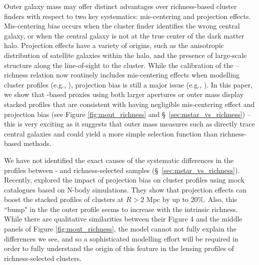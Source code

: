 \documentclass[fleqn,usenatbib,useAMS]{mnras}
\begin{document}
\begin{CJK*}{UTF8}{gbsn}
    Outer galaxy mass may offer distinct advantages over richness-based cluster finders with respect
    to two key systematics: mis-centering and projection effects.  
    Mis-centering bias occurs when the cluster finder identifies the wrong central galaxy, or when
    the central galaxy is not at the true center of the dark matter halo. 
    Projection effects have a variety of origins, such as the anisotropic distribution of satellite
    galaxies within the halo, and the presence of large-scale structure along the line-of-sight to
    the cluster. 
    While the calibration of the \mvir{}--richness relation now routinely includes mis-centering
    effects when modelling cluster \dsigma{} profiles (e.g., \citealt{Murata2018, Murata2019,
    McClintock2019}), projection bias is still a major issue (e.g., \citealt{Costanzi2019,
    Sunayama2020, DES2020, To2021b}). 
    In this paper, we show that \mstar{}-based proxies using both larger apertures or outer mass
    display stacked \dsigma{} profiles that are consistent with having negligible mis-centering
    effect and projection bias (see Figure \ref{fig:mout_richness} and \S\
    \ref{sec:mstar_vs_richness}) -- this is very exciting as it suggests that outer mass measures
    such as \menve{50}{100} directly trace central galaxies and could yield a more simple selection
    function than richness-based methods.  
    
    We have not identified the exact causes of the systematic differences in the \dsigma{} profiles
    between \mstar{}- and richness-selected samples (\S\ \ref{sec:mstar_vs_richness}).
    Recently, \citet{Sunayama2020} explored the impact of projection bias on cluster \dsigma{}
    profiles using mock catalogues based on N-body simulations.
    They show that projection effects can boost the stacked \dsigma{} profiles of clusters at $R >
    2$ Mpc by up to 20\%.
    Also, this ``bump" in the the outer \dsigma{} profile seems to increase with the intrinsic
    richness.
    While there are qualitative similarities between their Figure 4 and the middle panels of Figure
    \ref{fig:mout_richness}, the \citet{Sunayama2020} model cannot not fully explain the differences
    we see, and so a sophisticated modelling effort will be required in order to fully understand the
    origin of this feature in the lensing profiles of richness-selected clusters.
    

\end{CJK*}
\end{document}
